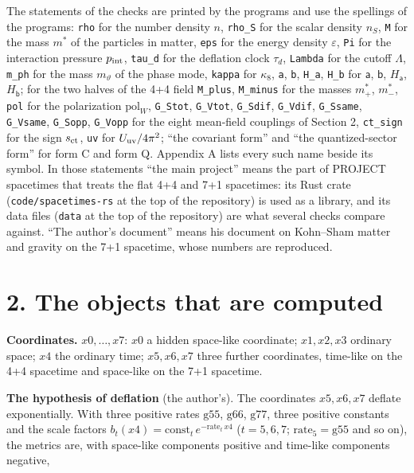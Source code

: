 \documentclass[
  10pt,
]{article}
\begin{document}
The statements of the checks are printed by the programs and use the
spellings of the programs: \texttt{rho} for the number density \(n\),
\texttt{rho\_S} for the scalar density \(n_S\), \texttt{M} for the mass
\(m^*\) of the particles in matter, \texttt{eps} for the energy density
\(\varepsilon\), \texttt{Pi} for the interaction pressure
\(p_{\rm int}\), \texttt{tau\_d} for the deflation clock \(\tau_d\),
\texttt{Lambda} for the cutoff \(\Lambda\), \texttt{m\_ph} for the mass
\(m_\vartheta\) of the phase mode, \texttt{kappa} for \(\kappa_8\),
\texttt{a}, \texttt{b}, \texttt{H\_a}, \texttt{H\_b} for \(\mathsf a\),
\(\mathsf b\), \(H_{\mathsf a}\), \(H_{\mathsf b}\); for the two halves
of the 4+4 field \texttt{M\_plus}, \texttt{M\_minus} for the masses
\(m^*_+\), \(m^*_-\), \texttt{pol} for the polarization
\(\mathrm{pol}_W\), \texttt{G\_Stot}, \texttt{G\_Vtot},
\texttt{G\_Sdif}, \texttt{G\_Vdif}, \texttt{G\_Ssame},
\texttt{G\_Vsame}, \texttt{G\_Sopp}, \texttt{G\_Vopp} for the eight
mean-field couplings of Section 2, \texttt{ct\_sign} for the sign
\(s_{\rm ct}\), \texttt{uv} for \(U_{\rm uv}/4\pi^2\); ``the covariant
form'' and ``the quantized-sector form'' for form C and form Q. Appendix
A lists every such name beside its symbol. In those statements ``the
main project'' means the part of PROJECT spacetimes that treats the flat
4+4 and 7+1 spacetimes: its Rust crate (\texttt{code/spacetimes-rs} at
the top of the repository) is used as a library, and its data files
(\texttt{data} at the top of the repository) are what several checks
compare against. ``The author's document'' means his document on
Kohn--Sham matter and gravity on the 7+1 spacetime, whose numbers are
reproduced.

\hypertarget{the-objects-that-are-computed}{%
\section{2. The objects that are
computed}\label{the-objects-that-are-computed}}

\textbf{Coordinates.} \(x0,\dots,x7\): \(x0\) a hidden space-like
coordinate; \(x1,x2,x3\) ordinary space; \(x4\) the ordinary time;
\(x5,x6,x7\) three further coordinates, time-like on the 4+4 spacetime
and space-like on the 7+1 spacetime.

\textbf{The hypothesis of deflation} (the author's). The coordinates
\(x5,x6,x7\) deflate exponentially. With three positive rates
\(\mathrm{g55}\), \(\mathrm{g66}\), \(\mathrm{g77}\), three positive
constants and the scale factors
\(b_t(x4)=\mathrm{const}_t\,e^{-\mathrm{rate}_t\,x4}\) (\(t=5,6,7\);
\(\mathrm{rate}_5=\mathrm{g55}\) and so on), the metrics are, with
space-like components positive and time-like components negative,
\end{document}
